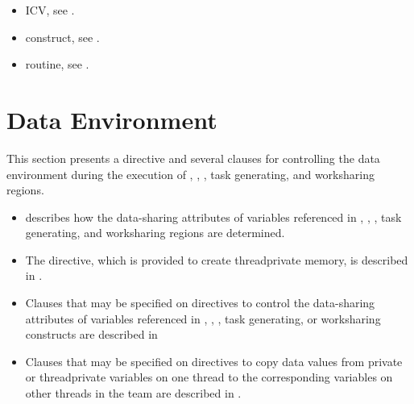 {{{{\begin{samepage}
\crossreferences
\begin{itemize}
\item {} ICV, see
.

\item {} construct, see 
.

\item {} routine, see 
.
\end{itemize}
\end{samepage}









\section{Data Environment}
\label{sec:Data Environment}
This section presents a directive and several clauses for controlling the data environment 
during the execution of , , , task generating, and worksharing regions.

\begin{itemize}
\item {} 
describes how the data-sharing attributes of variables
referenced in , , , task generating, and worksharing regions are determined.

\item The  directive, which is provided to create threadprivate memory, 
is described in .

\item Clauses that may be specified on directives to control the data-sharing attributes of 
variables referenced in , , , task generating, or worksharing constructs are described in 

\item Clauses that may be specified on directives to copy data values from private or 
threadprivate variables on one thread to the corresponding variables on other threads 
in the team are described in .


\end{itemize}}}}}
